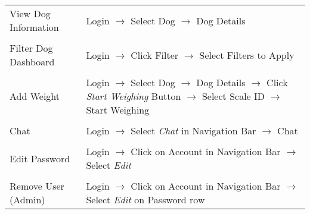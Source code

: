 \newlength\qqq
\newlength\qqqq
\setlength{}
\setlength{}
\begin{tabular}{p{\qqq}|p{\qqqq}}
View Dog Information & Login $\rightarrow$ Select Dog $\rightarrow$ Dog Details\\\\
Filter Dog Dashboard & Login $\rightarrow$ Click Filter $\rightarrow$ Select Filters to Apply\\\\
Add Weight & Login $\rightarrow$ Select Dog $\rightarrow$ Dog Details $\rightarrow$ Click \textit{Start Weighing} Button $\rightarrow$ Select Scale ID $\rightarrow$ Start Weighing\\\\
Chat & Login $\rightarrow$ Select \textit{Chat} in Navigation Bar $\rightarrow$ Chat\\\\
Edit Password & Login $\rightarrow$ Click on Account in Navigation Bar $\rightarrow$ Select \textit{Edit}\\\\
Remove User (Admin) & Login $\rightarrow$ Click on Account in Navigation Bar $\rightarrow$ Select \textit{Edit} on Password row 
\end{tabular}


